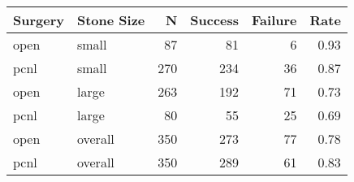\begin{table}[ht]
\centering
\begin{tabular}{llrrrr}
  \toprule
{\textbf{Surgery}} & {\textbf{Stone Size}} & {\textbf{N}} & {\textbf{Success}} & {\textbf{Failure}} & {\textbf{Rate}} \\ 
  \midrule
open & small &  87 &  81 &   6 & 0.93 \\ 
  pcnl & small & 270 & 234 &  36 & 0.87 \\ 
  open & large & 263 & 192 &  71 & 0.73 \\ 
  pcnl & large &  80 &  55 &  25 & 0.69 \\ 
  open & overall & 350 & 273 &  77 & 0.78 \\ 
  pcnl & overall & 350 & 289 &  61 & 0.83 \\ 
   \bottomrule
\end{tabular}
\end{table}
